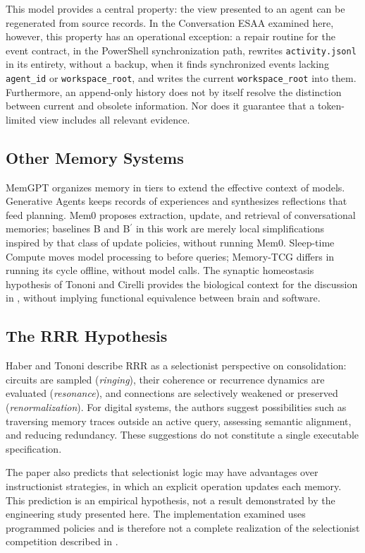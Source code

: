 \documentclass[11pt,a4paper]{article}
\begin{document}
This model provides a central property: the view presented to an agent can be regenerated from source records. In the Conversation ESAA examined here, however, this property has an operational exception: a repair routine for the event contract, in the PowerShell synchronization path, rewrites \texttt{activity.\allowbreak{}jsonl} in its entirety, without a backup, when it finds synchronized events lacking \texttt{agent\_id} or \texttt{workspace\_\allowbreak{}root}, and writes the current \texttt{workspace\_\allowbreak{}root} into them. Furthermore, an append-only history does not by itself resolve the distinction between current and obsolete information. Nor does it guarantee that a token-limited view includes all relevant evidence.

\subsection{Other Memory Systems}\label{sec:2.2}
MemGPT \cite{ref4} organizes memory in tiers to extend the effective context of models. Generative Agents \cite{ref5} keeps records of experiences and synthesizes reflections that feed planning. Mem0 \cite{ref6} proposes extraction, update, and retrieval of conversational memories; baselines B and B\ensuremath{^{\prime}} in this work are merely local simplifications inspired by that class of update policies, without running Mem0. Sleep-time Compute \cite{ref7} moves model processing to before queries; Memory-TCG differs in running its cycle offline, without model calls. The synaptic homeostasis hypothesis of Tononi and Cirelli \cite{ref8} provides the biological context for the discussion in \cite{ref2}, without implying functional equivalence between brain and software.

\subsection{The RRR Hypothesis}\label{sec:2.3}
Haber and Tononi \cite{ref2} describe RRR as a selectionist perspective on consolidation: circuits are sampled (\emph{ringing}), their coherence or recurrence dynamics are evaluated (\emph{resonance}), and connections are selectively weakened or preserved (\emph{renormalization}). For digital systems, the authors suggest possibilities such as traversing memory traces outside an active query, assessing semantic alignment, and reducing redundancy. These suggestions do not constitute a single executable specification.

The paper also predicts that selectionist logic may have advantages over instructionist strategies, in which an explicit operation updates each memory. This prediction is an empirical hypothesis, not a result demonstrated by the engineering study presented here. The implementation examined uses programmed policies and is therefore not a complete realization of the selectionist competition described in \cite{ref2}.
\end{document}
